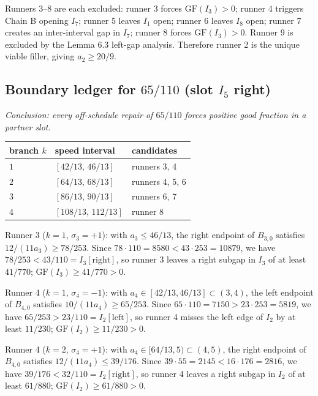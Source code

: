 \documentclass[12pt]{article}
\begin{document}
Runners 3–8 are each excluded: runner 3 forces $\mathrm{GF}(I_3)>0$; runner 4 triggers
Chain B opening $I_7$; runner 5 leaves $I_1$ open; runner 6 leaves $I_8$ open;
runner 7 creates an inter-interval gap in $I_7$; runner 8 forces $\mathrm{GF}(I_3)>0$.
Runner 9 is excluded by the Lemma 6.3 left-gap analysis.
Therefore runner 2 is the unique viable filler, giving $a_2\ge 20/9$.

\subsection{Boundary ledger for $65/110$ (slot $I_5$ right)}

\emph{Conclusion: every off-schedule repair of $65/110$ forces positive good fraction in a
partner slot.}

\begin{center}
\begin{tabular}{@{}lll@{}}
\toprule
branch $k$ & speed interval & candidates \\
\midrule
$1$ & $[42/13,\,46/13]$ & runners 3, 4 \\
$2$ & $[64/13,\,68/13]$ & runners 4, 5, 6 \\
$3$ & $[86/13,\,90/13]$ & runners 6, 7 \\
$4$ & $[108/13,\,112/13]$ & runner 8 \\
\bottomrule
\end{tabular}
\end{center}

Runner 3 ($k=1$, $\sigma_3=+1$): with $a_3\le 46/13$, the right endpoint of $B_{3,0}$
satisfies $12/(11a_3)\ge 78/253$. Since $78\cdot110=8580<43\cdot253=10879$, we have
$78/253<43/110=I_3[\text{right}]$, so runner 3 leaves a right subgap in $I_3$ of at
least $41/770$; $\mathrm{GF}(I_3)\ge 41/770>0$.

Runner 4 ($k=1$, $\sigma_4=-1$): with $a_4\in[42/13,46/13]\subset(3,4)$, the left
endpoint of $B_{4,0}$ satisfies $10/(11a_4)\ge 65/253$. Since
$65\cdot110=7150>23\cdot253=5819$, we have $65/253>23/110=I_2[\text{left}]$, so runner 4
misses the left edge of $I_2$ by at least $11/230$; $\mathrm{GF}(I_2)\ge 11/230>0$.

Runner 4 ($k=2$, $\sigma_4=+1$): with $a_4\in[64/13,5)\subset(4,5)$, the right endpoint
of $B_{4,0}$ satisfies $12/(11a_4)\le 39/176$. Since $39\cdot55=2145<16\cdot176=2816$,
we have $39/176<32/110=I_2[\text{right}]$, so runner 4 leaves a right subgap in $I_2$ of
at least $61/880$; $\mathrm{GF}(I_2)\ge 61/880>0$.
\end{document}
